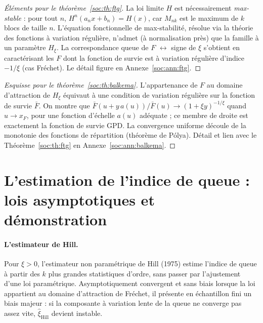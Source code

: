 



\begin{proof}[Éléments pour le théorème~\ref{soc:th:ftg}]
La loi limite $H$ est nécessairement \emph{max-stable} : pour tout $n$, $H^n(a_nx+b_n)=H(x)$, car $M_{nk}$ est le maximum de $k$ blocs de taille $n$. L'équation fonctionnelle de max-stabilité, résolue via la théorie des fonctions à variation régulière, n'admet (à normalisation près) que la famille à un paramètre $H_\xi$. La correspondance queue de $F$ $\leftrightarrow$ signe de $\xi$ s'obtient en caractérisant les $F$ dont la fonction de survie est à variation régulière d'indice $-1/\xi$ (cas Fréchet). Le détail figure en Annexe~\ref{soc:ann:ftg}.
\end{proof}

\begin{proof}[Esquisse pour le théorème~\ref{soc:th:balkema}]
L'appartenance de $F$ au domaine d'attraction de $H_\xi$ équivaut à une condition de variation régulière sur la fonction de survie $\bar F$. On montre que $\bar F(u+y\,a(u))/\bar F(u)\to(1+\xi y)^{-1/\xi}$ quand $u\to x_F$, pour une fonction d'échelle $a(u)$ adéquate ; ce membre de droite est exactement la fonction de survie GPD. La convergence uniforme découle de la monotonie des fonctions de répartition (théorème de Pólya). Détail et lien avec le Théorème~\ref{soc:th:ftg} en Annexe~\ref{soc:ann:balkema}.
\end{proof}

\section{L'estimation de l'indice de queue : lois asymptotiques et démonstration}
\label{sec:ann-estimation-queue}


\paragraph{L'estimateur de Hill.}
Pour $\xi > 0$, l'estimateur non paramétrique de Hill (1975) estime l'indice de queue à partir des $k$ plus grandes statistiques d'ordre, sans passer par l'ajustement d'une loi paramétrique. Asymptotiquement convergent et sans biais lorsque la loi appartient au domaine d'attraction de Fréchet, il présente en échantillon fini un biais majeur : si la composante à variation lente de la queue ne converge pas assez vite, $\hat{\xi}_{\text{Hill}}$ devient instable.

